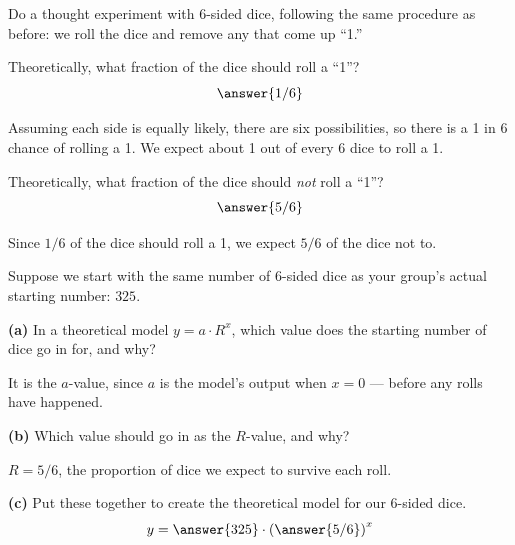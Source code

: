 \documentclass[12pt]{ximera}
\begin{document}
Do a thought experiment with 6-sided dice, following the same procedure as before: we
roll the dice and remove any that come up ``1.''

\begin{problem}
Theoretically, what fraction of the dice should roll a ``1''?
\[
\answer{1/6}
\]
\begin{solution}
Assuming each side is equally likely, there are six possibilities, so there is a 1 in
6 chance of rolling a 1. We expect about 1 out of every 6 dice to roll a 1.
\end{solution}
\end{problem}

\begin{problem}
Theoretically, what fraction of the dice should \emph{not} roll a ``1''?
\[
\answer{5/6}
\]
\begin{solution}
Since $1/6$ of the dice should roll a 1, we expect $5/6$ of the dice not to.
\end{solution}
\end{problem}

\begin{problem}
Suppose we start with the same number of 6-sided dice as your group's actual starting
number: $325$.

\begin{prompt}
\textbf{(a)} In a theoretical model $y = a \cdot R^{x}$, which value does the
starting number of dice go in for, and why?
\begin{freeResponse}
\end{freeResponse}
\begin{solution}
It is the $a$-value, since $a$ is the model's output when $x = 0$ --- before any
rolls have happened.
\end{solution}
\end{prompt}

\begin{prompt}
\textbf{(b)} Which value should go in as the $R$-value, and why?
\begin{freeResponse}
\end{freeResponse}
\begin{solution}
$R = 5/6$, the proportion of dice we expect to survive each roll.
\end{solution}
\end{prompt}

\begin{prompt}
\textbf{(c)} Put these together to create the theoretical model for our 6-sided dice.
\[
y = \answer{325} \cdot \left(\answer{5/6}\right)^{x}
\]
\end{prompt}
\end{problem}
\end{document}
